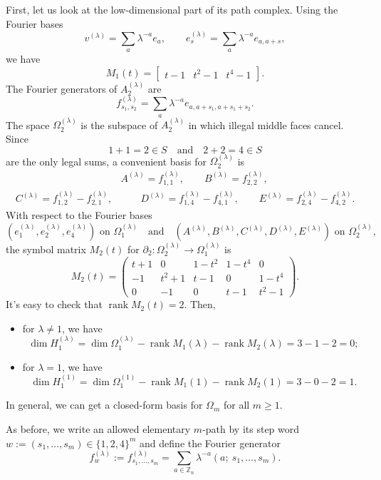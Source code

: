 \documentclass[11pt]{amsart}
\newcommand{\Z}{\mathbb Z}
\newcommand{\rank}{\operatorname{rank}}
\theoremstyle{plain}
\theoremstyle{definition}
\numberwithin{equation}{section}
\begin{document}
First, let us look at the low-dimensional part of its path complex. Using the Fourier bases
\[
v^{(\lambda)}=\sum_a \lambda^{-a}e_a,\qquad
e_s^{(\lambda)}=\sum_a \lambda^{-a}e_{a,a+s},
\]
we have
\[
M_1(t)=\begin{bmatrix} t-1 & t^2-1 & t^4-1\end{bmatrix}.
\]
The Fourier generators of $A_2^{(\lambda)}$ are
\[f_{s_1,s_2}^{(\lambda)}=\sum_a \lambda^{-a}e_{a,a+s_1,a+s_1+s_2}.\]
The space $\Omega_2^{(\lambda)}$ is the subspace of $A_2^{(\lambda)}$ in which illegal middle faces cancel.
Since 
\[1+1=2\in S\quad\text{and}\quad 2+2=4\in S\] 
are the only legal sums, a convenient basis for $\Omega_2^{(\lambda)}$ is
\begin{align*}
\qquad &    A^{(\lambda)}=f_{1,1}^{(\lambda)}, \qquad B^{(\lambda)}=f_{2,2}^{(\lambda)},\\
C^{(\lambda)}=f_{1,2}^{(\lambda)}-f_{2,1}^{(\lambda)},&\qquad D^{(\lambda)}=f_{1,4}^{(\lambda)}-f_{4,1}^{(\lambda)},\qquad E^{(\lambda)}=f_{2,4}^{(\lambda)}-f_{4,2}^{(\lambda)}.
\end{align*}
With respect to the Fourier bases 
\[(e_1^{(\lambda)},e_2^{(\lambda)},e_4^{(\lambda)}) \text{ on } \Omega_1^{(\lambda)} \quad\text{and}
\quad (A^{(\lambda)},B^{(\lambda)},C^{(\lambda)},D^{(\lambda)},E^{(\lambda)}) \text{ on } \Omega_2^{(\lambda)},\]
the symbol matrix $M_2(t)$ for $\partial_2:\Omega_2^{(\lambda)}\to \Omega_1^{(\lambda)}$ is
\[
M_2(t)=
\begin{pmatrix}
t+1 & 0 & 1-t^2 & 1-t^4 & 0\\
-1 & t^2+1 & t-1 & 0 & 1-t^4\\
0 & -1 & 0 & t-1 & t^2-1
\end{pmatrix}.
\]
It's easy to check that $\rank M_2(t)=2$. Then,
\begin{itemize}
    \item for $\lambda\neq1$, we have
    \[\dim H_1^{(\lambda)}=\dim\Omega_1^{(\lambda)}-\rank M_1(\lambda)-\rank M_2(\lambda)=3-1-2=0;\]
    \item for $\lambda=1$, we have
    \[\dim H_1^{(1)}=\dim\Omega_1^{(1)}-\rank M_1(1)-\rank M_2(1)=3-0-2=1.\]
\end{itemize}

In general, we can get a closed-form basis for $\Omega_m$ for all $m\ge 1$.

\smallskip
As before, we write an allowed elementary $m$-path by its step word $w:=(s_1,\dots,s_m)\in \{1,2,4\}^m$ and define the Fourier generator
\[f_w^{(\lambda)}:=f_{s_1,\ldots,s_m}^{(\lambda)}=\sum_{a\in\Z_n}\lambda^{-a}(a;~s_1,\ldots,s_m).\]
\end{document}

